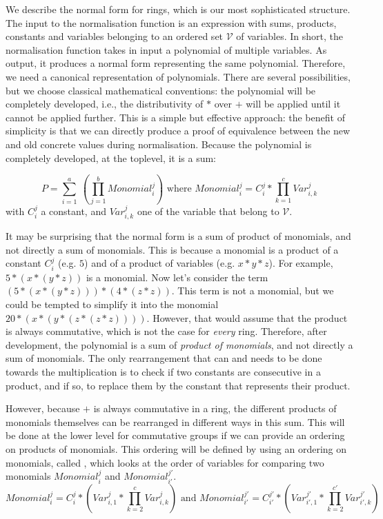 We describe the normal form for rings, which is our most sophisticated
structure. The input to the normalisation function is an expression 
with sums, products, constants and variables belonging to an
ordered set $\mathcal{V}$ of variables. In short, the normalisation function takes in input a polynomial of multiple variables. As output, it produces a
normal form representing the same polynomial. Therefore, we need a
canonical representation of polynomials. 
There are several possibilities, but we choose
classical mathematical conventions: 
the polynomial will be completely developed, i.e., the
distributivity of $*$ over $+$ will be applied until it cannot be applied
further.
This is a simple but effective approach: the benefit of simplicity is that we
can directly produce a proof of equivalence between the new and old concrete values
during normalisation.
Because the polynomial is completely developed, at the
toplevel, it is a sum:

\[
P = \sum_{i=1}^{a}\ (\prod_{j=1}^{b} Monomial_{i}^j)
\text{ where } 
Monomial_{i}^j = C_{i}^j * \prod_{k=1}^{c} Var_{i,k}^{j}
\]
with $C_{i}^j$ a constant, and $Var_{i,k}^{j}$ one of the variable that belong to $\mathcal{V}$.

It may be surprising that the normal form is a sum of product of
monomials, and not directly a sum of monomials. This is because a
monomial is a product of a constant $C_{i}^j$ (e.g. $5$) and of a product of
variables (e.g. $x*y*z$). For example, $5*(x*(y*z))$ is a monomial. Now let's
consider the term $(5*(x*(y*z))) * (4*(z*z))$. This term is not a monomial, but
we could be tempted to simplify it into the monomial $20*(x*(y*(z*(z*z))))$.
However, that would assume that the product is always commutative, which
is not the case for \emph{every} ring.
Therefore, after 
development, the polynomial is a sum of \emph{product of monomials}, and
not directly a sum of monomials. The only rearrangement that can and needs to be done
towards the multiplication is to check if two constants are consecutive in a
product, and if so, to replace them by the constant that represents 
their product.

However, because $+$ is always commutative in a ring, the different
products of monomials themselves can be rearranged in different ways in this
sum. This will be done at the lower level for commutative groups if we can
provide an ordering on products of monomials. This ordering will be defined by using an ordering on monomials, called , which
looks at the order of variables for comparing two monomials
$Monomial_{i}^{j}$ and $Monomial_{i'}^{j'}$.
\[
Monomial_{i}^{j} = C_{i}^{j} * (Var_{i,1}^{j} * \prod_{k=2}^{c} Var_{i,k}^{j})
\text{ and }
Monomial_{i'}^{j'} = C_{i'}^{j'} * (Var_{i',1}^{j'} * \prod_{k=2}^{c'} Var_{i',k}^{j'})
\]

